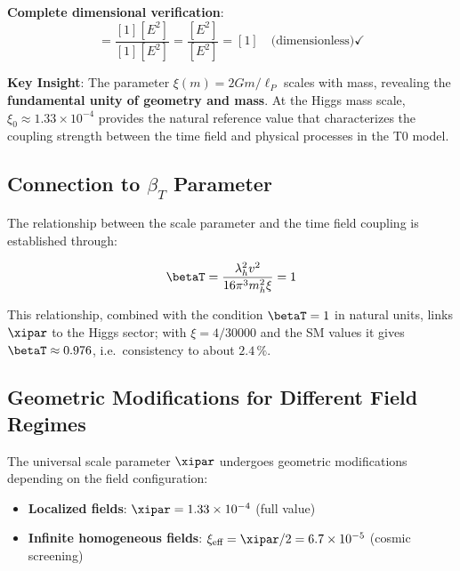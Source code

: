 	\textbf{Complete dimensional verification}:
	\begin{equation}
		[\xi] = \frac{[1][E^2]}{[1][E^2]} = \frac{[E^2]}{[E^2]} = [1] \quad \text{(dimensionless)} \checkmark
	\end{equation}
	
\begin{tcolorbox}[colback=green!5!white,colframe=green!75!black,title=Universal Scale Parameter]
	\textbf{Key Insight}: The parameter $\xi(m) = 2Gm/\ell_P$ scales with mass, revealing the \textbf{fundamental unity of geometry and mass}. At the Higgs mass scale, $\xi_0 \approx 1.33 \times 10^{-4}$ provides the natural reference value that characterizes the coupling strength between the time field and physical processes in the T0 model.
\end{tcolorbox}
	
	\subsection{Connection to $\beta_T$ Parameter}
	\label{subsec:beta_t_connection}
	
	The relationship between the scale parameter and the time field coupling is established through:
	
	\begin{equation}
		\betaT = \frac{\lambda_h^2 v^2}{16\pi^3 m_h^2 \xi} = 1
		\label{eq:beta_t_relationship}
	\end{equation}
	
	This relationship, combined with the condition $\betaT = 1$ in natural units, links $\xipar$ to the Higgs sector; with $\xi = 4/30000$ and the SM values it gives $\betaT \approx 0.976$, i.e.\ consistency to about $2.4\,\%$.
	
	\subsection{Geometric Modifications for Different Field Regimes}
	\label{subsec:geometric_modifications}
	
	The universal scale parameter $\xipar$ undergoes geometric modifications depending on the field configuration:
	
	\begin{itemize}
		\item \textbf{Localized fields}: $\xipar = 1.33 \times 10^{-4}$ (full value)
		\item \textbf{Infinite homogeneous fields}: $\xi_{\text{eff}} = \xipar/2 = 6.7 \times 10^{-5}$ (cosmic screening)
	\end{itemize}
	
